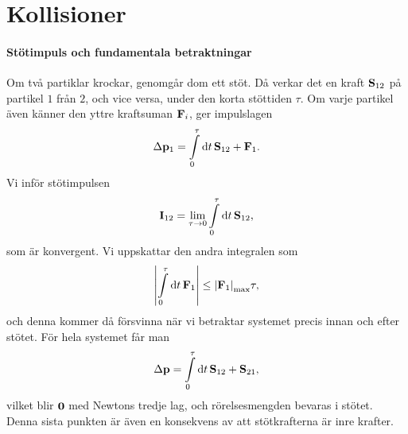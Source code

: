 \section{Kollisioner}

\paragraph{Stötimpuls och fundamentala betraktningar}
Om två partiklar krockar, genomgår dom ett stöt. Då verkar det en kraft $\vb{S}_{12}$ på partikel $1$ från $2$, och vice versa, under den korta stöttiden $\tau$. Om varje partikel även känner den yttre kraftsuman $\vb{F}_{i}$, ger impulslagen
\begin{align*}
	\Delta\vb{p}_{1} = \int\limits_{0}^{\tau}\dd{t}\vb{S}_{12} + \vb{F}_{1}.
\end{align*}
Vi inför stötimpulsen
\begin{align*}
	\vb{I}_{12} = \lim\limits_{\tau\to 0}\int\limits_{0}^{\tau}\dd{t}\vb{S}_{12},
\end{align*}
som är konvergent. Vi uppskattar den andra integralen som
\begin{align*}
	\abs{\int\limits_{0}^{\tau}\dd{t}\vb{F}_{1}}\leq\abs{\vb{F}_{1}}_{\text{max}}\tau,
\end{align*}
och denna kommer då försvinna när vi betraktar systemet precis innan och efter stötet. För hela systemet får man
\begin{align*}
	\Delta\vb{p} = \int\limits_{0}^{\tau}\dd{t}\vb{S}_{12} + \vb{S}_{21},
\end{align*}
vilket blir $\vb{0}$ med Newtons tredje lag, och rörelsesmengden bevaras i stötet. Denna sista punkten är även en konsekvens av att stötkrafterna är inre krafter.

